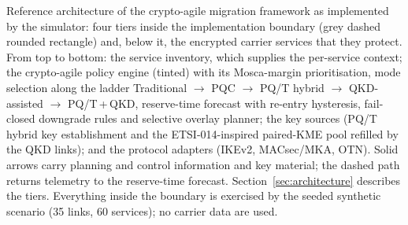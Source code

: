 Reference architecture of the crypto-agile migration framework as implemented
by the simulator: four tiers inside the implementation boundary (grey dashed
rounded rectangle) and, below it, the encrypted carrier services that they
protect. From top to bottom: the service inventory, which supplies the
per-service context; the crypto-agile policy engine (tinted) with its
Mosca-margin prioritisation, mode selection along the ladder Traditional
$\rightarrow$ PQC $\rightarrow$ PQ/T hybrid $\rightarrow$ QKD-assisted
$\rightarrow$ PQ/T\,+\,QKD, reserve-time forecast with re-entry hysteresis,
fail-closed downgrade rules and selective overlay planner; the key sources
(PQ/T hybrid key establishment and the ETSI-014-inspired paired-KME pool
refilled by the QKD links); and the protocol adapters (IKEv2, MACsec/MKA,
OTN). Solid arrows carry planning and control information and key material;
the dashed path returns telemetry to the reserve-time forecast.
Section~\ref{sec:architecture} describes the tiers. Everything inside the
boundary is exercised by the seeded synthetic scenario (35 links,
60 services); no carrier data are used.
